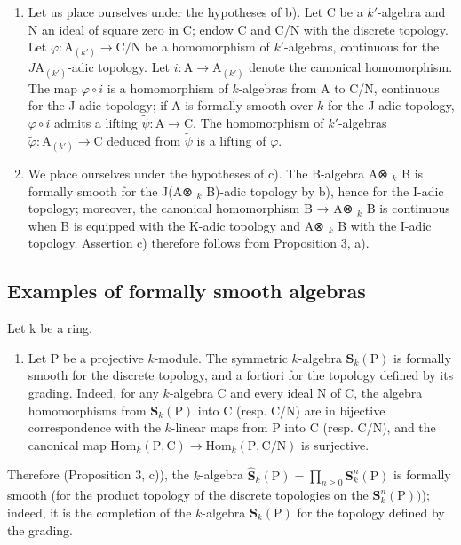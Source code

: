 \begin{enumerate}
\item
  Let us place ourselves under the hypotheses of b). Let C be a \(k'\)-algebra and N an ideal of square zero in C; endow C and C/N with the discrete topology. Let \(\varphi : \mathrm{A}_{(k')} \longrightarrow \mathrm{C/N}\) be a homomorphism of \(k'\)-algebras, continuous for the \(J\mathrm{A}_{(k')}\)-adic topology. Let \(i : \mathrm{A} \to \mathrm{A}_{(k')}\) denote the canonical homomorphism. The map \(\varphi \circ i\) is a homomorphism of \(k\)-algebras from A to C/N, continuous for the J-adic topology; if A is formally smooth over \(k\) for the J-adic topology, \(\varphi \circ i\) admits a lifting \(\tilde{\psi} : \mathrm{A} \to \mathrm{C}\). The homomorphism of \(k'\)-algebras \(\tilde{\varphi} : \mathrm{A}_{(k')} \longrightarrow \mathrm{C}\) deduced from \(\tilde{\psi}\) is a lifting of \(\varphi\).
\item
  We place ourselves under the hypotheses of c). The B-algebra A⊗ \(_{k}\) B is formally smooth for the J(A⊗ \(_{k}\) B)-adic topology by b), hence for the I-adic topology; moreover, the canonical homomorphism B → A⊗ \(_{k}\) B is continuous when B is equipped with the K-adic topology and A⊗ \(_{k}\) B with the I-adic topology. Assertion c) therefore follows from Proposition 3, a).
\end{enumerate}

\subsection{Examples of formally smooth algebras}

Let k be a ring.

\begin{enumerate}
\def\labelenumi{\arabic{enumi})}
\tightlist
\item
  Let P be a projective \(k\)-module. The symmetric \(k\)-algebra \(\mathbf{S}_k(\mathrm{P})\) is formally smooth for the discrete topology, and a fortiori for the topology defined by its grading. Indeed, for any \(k\)-algebra C and every ideal N of C, the algebra homomorphisms from \(\mathbf{S}_k(\mathrm{P})\) into C (resp. C/N) are in bijective correspondence with the \(k\)-linear maps from P into C (resp. C/N), and the canonical map \(\mathrm{Hom}_k(\mathrm{P},\mathrm{C}) \to \mathrm{Hom}_k(\mathrm{P},\mathrm{C}/\mathrm{N})\) is surjective.
\end{enumerate}

Therefore (Proposition 3, c)), the \(k\)-algebra \(\widehat{\mathbf{S}}_k(\mathrm{P}) = \prod_{n\geqslant 0}\mathbf{S}_k^n (\mathrm{P})\) is formally smooth (for the product topology of the discrete topologies on the \(\mathbf{S}_k^n (\mathrm{P}))\)); indeed, it is the completion of the \(k\)-algebra \(\mathbf{S}_k(\mathrm{P})\) for the topology defined by the grading.

